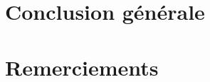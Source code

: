 \section{Conclusion générale}
\paragraph{}
\subparagraph{}
\subparagraph{}
\subparagraph{}
\subparagraph{}

\section{Remerciements}
